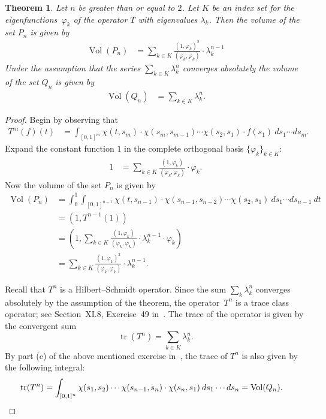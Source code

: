 \documentclass[11pt,reqno]{amsart}
\newtheorem{theorem}[lemma]{Theorem}
\theoremstyle{definition}
\numberwithin{equation}{section}
\newcommand{\bl}[2]{(#1,#2)}
\newcommand{\bigbl}[2]{\left(#1,#2\right)}
\DeclareMathOperator{\trace}{tr}
\DeclareMathOperator{\Vol}{Vol}
\begin{document}
\begin{theorem}
Let $n$ be greater than or equal to $2$.
Let $K$ be an index set for the eigenfunctions~$\varphi_{k}$ of the operator $T$
with eigenvalues $\lambda_{k}$.
Then the volume of the set $P_{n}$ is given by
\begin{align}
\Vol(P_{n})
& =
\sum_{k \in K}
\frac{\bl{1}{\varphi_{k}}^{2}}{\bl{\varphi_{k}}{\varphi_{k}}}
\cdot
\lambda_{k}^{n-1} 
\label{equation_volume_P}
\end{align}
Under the assumption that the series
$\sum_{k \in K} \lambda_{k}^{n}$ converges absolutely
the volume of the set $Q_{n}$ is given by
\begin{align}
\Vol(Q_{n})
& =
\sum_{k \in K}
\lambda_{k}^{n} .
\label{equation_volume_Q}
\end{align}
\label{theorem_volumes}
\end{theorem}
\begin{proof}
Begin by observing that
\begin{align*}
T^{m}(f)(t)
& =
\int_{[0,1]^{m}}
\chi(t,s_{m}) \cdot \chi(s_{m},s_{m-1}) \cdots \chi(s_{2},s_{1})
\cdot f(s_{1}) 
\: ds_{1} \cdots ds_{m} .
\end{align*}
Expand the constant function $1$ 
in the complete orthogonal basis
$\{\varphi_{k}\}_{k \in K}$:
\begin{align*}
1
& =
\sum_{k \in K}
\frac{\bl{1}{\varphi_{k}}}{\bl{\varphi_{k}}{\varphi_{k}}}
\cdot
\varphi_{k} .
\end{align*}
Now the volume of the set $P_{n}$ is given by
\begin{align*}
\Vol(P_{n})
& =
\int_{0}^{1}
\int_{[0,1]^{n-1}}
\chi(t,s_{n-1}) \cdot \chi(s_{n-1},s_{n-2}) \cdots \chi(s_{2},s_{1})
\: ds_{1} \cdots ds_{n-1} \: dt \\
& =
\bl{1}{T^{n-1}(1)} \\
& =
\bigbl{1}{
\sum_{k \in K}
\frac{\bl{1}{\varphi_{k}}}{\bl{\varphi_{k}}{\varphi_{k}}}
\cdot
\lambda_{k}^{n-1}
\cdot
\varphi_{k} 
} \\
& =
\sum_{k \in K}
\frac{\bl{1}{\varphi_{k}}^{2}}{\bl{\varphi_{k}}{\varphi_{k}}}
\cdot
\lambda_{k}^{n-1} .
\end{align*}

Recall that $T^{n}$ is a Hilbert--Schmidt operator.
Since the sum $\sum_{k} \lambda_{k}^{n}$
converges absolutely by the assumption of the theorem,
the operator~$T^{n}$ is a trace class operator;
see
Section~XI.8, Exercise~49 in~\cite{Dunford_Schwartz}.
The trace of the operator is given by
the convergent sum
$$  \trace(T^{n}) = \sum_{k \in K} \lambda_{k}^{n}  .  $$
By part (c) of the above mentioned exercise in~\cite{Dunford_Schwartz},
the trace of $T^{n}$ is also given by
the following integral:
\begin{align*}
\trace(T^{n})
& = 
\int_{[0,1]^{n}} 
\chi(s_{1},s_{2}) \cdots \chi(s_{n-1},s_{n}) \cdot \chi(s_{n},s_{1})
\: ds_{1} \cdots ds_{n}
= 
\Vol(Q_{n}) .
\qedhere
\end{align*}
\end{proof}
\end{document}
